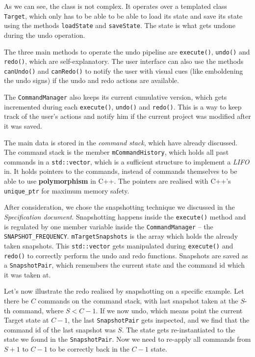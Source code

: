 As we can see, the class is not complex. It operates over a templated class \texttt{Target}, which only has to be able to be able to load its state and save its state using the methods \texttt{loadState} and \texttt{saveState}. The state is what gets undone during the undo operation.

The three main methods to operate the undo pipeline are \texttt{execute()}, \texttt{undo()} and \texttt{redo()}, which are self-explanatory. The user interface can also use the methods \texttt{canUndo()} and \texttt{canRedo()} to notify the user with visual cues (like emboldening the undo signs) if the undo and redo actions are available.

The \texttt{CommandManager} also keeps its current cumulative version, which gets incremented during each \texttt{execute()}, \texttt{undo()} and \texttt{redo()}. This is a way to keep track of the user's actions and notify him if the current project was modified after it was saved.

The main data is stored in the \textit{command stack}, which have already discussed. The command stack is the member \texttt{mCommandHistory}, which holds all past commands in a \texttt{std::vector}, which is a sufficient structure to implement a \textit{LIFO} in. It holds pointers to the commands, instead of commands themselves to be able to use \textbf{polymorphism} in C++. The pointers are realised with C++'s \texttt{unique\_ptr} for maximum memory safety.

After consideration, we chose the snapshotting technique we discussed in the \textit{Specification document}. Snapshotting happens inside the \texttt{execute()} method and is regulated by one member variable inside the \texttt{CommandManager} -- the \texttt{SNAPSHOT\_FREQUENCY}. \texttt{mTargetSnapshots} is the array which holds the already taken snapshots. This \texttt{std::vector} gets manipulated during \texttt{execute()} and \texttt{redo()} to correctly perform the undo and redo functions. Snapshots are saved as a \texttt{SnapshotPair}, which remembers the current state and the command id which it was taken at.

Let's now illustrate the redo realised by snapshotting on a specific example. Let there be $C$ commands on the command stack, with last snapshot taken at the $S$-th command, where $S < C - 1$. If we now undo, which means point the current Target state at $C - 1$, the last \texttt{SnapshotPair} gets inspected, and we find that the command id of the last snapshot was $S$. The state gets re-instantiated to the state we found in the \texttt{SnapshotPair}. Now we need to re-apply all commands from $S+1$ to $C-1$ to be correctly back in the $C-1$ state.